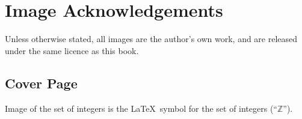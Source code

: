 \chapter{Image Acknowledgements}
Unless otherwise stated, all images are the author's own work, and are released under the same licence as this book.

\section{Cover Page}
Image of the set of integers is the \LaTeX\, symbol for the set of integers (``$\mathbb{Z}$'').

\printbibliography[heading=bibintoc, title={References and Bibliography}]


